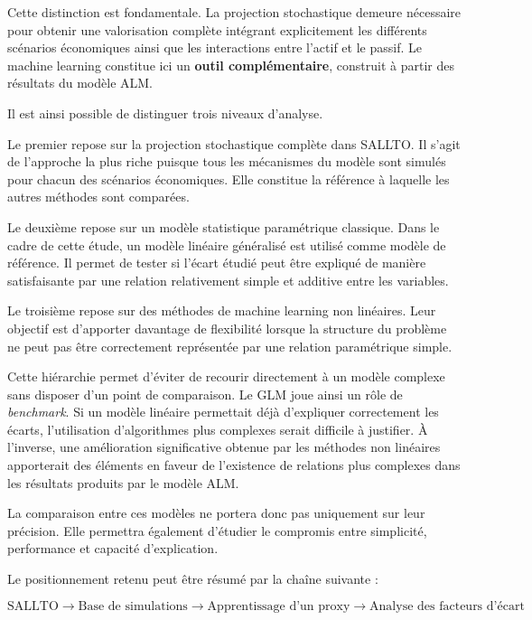 Cette distinction est fondamentale. La projection stochastique demeure nécessaire pour obtenir une valorisation complète intégrant explicitement les différents scénarios économiques ainsi que les interactions entre l'actif et le passif. Le machine learning constitue ici un \textbf{outil complémentaire}, construit à partir des résultats du modèle ALM.

Il est ainsi possible de distinguer trois niveaux d'analyse.

Le premier repose sur la projection stochastique complète dans SALLTO. Il s'agit de l'approche la plus riche puisque tous les mécanismes du modèle sont simulés pour chacun des scénarios économiques. Elle constitue la référence à laquelle les autres méthodes sont comparées.

Le deuxième repose sur un modèle statistique paramétrique classique. Dans le cadre de cette étude, un modèle linéaire généralisé est utilisé comme modèle de référence. Il permet de tester si l'écart étudié peut être expliqué de manière satisfaisante par une relation relativement simple et additive entre les variables.

Le troisième repose sur des méthodes de machine learning non linéaires. Leur objectif est d'apporter davantage de flexibilité lorsque la structure du problème ne peut pas être correctement représentée par une relation paramétrique simple.

Cette hiérarchie permet d'éviter de recourir directement à un modèle complexe sans disposer d'un point de comparaison. Le GLM joue ainsi un rôle de \textit{benchmark}. Si un modèle linéaire permettait déjà d'expliquer correctement les écarts, l'utilisation d'algorithmes plus complexes serait difficile à justifier. À l'inverse, une amélioration significative obtenue par les méthodes non linéaires apporterait des éléments en faveur de l'existence de relations plus complexes dans les résultats produits par le modèle ALM.

La comparaison entre ces modèles ne portera donc pas uniquement sur leur précision. Elle permettra également d'étudier le compromis entre simplicité, performance et capacité d'explication.

Le positionnement retenu peut être résumé par la chaîne suivante :

\begin{equation}
\boxed{
\text{SALLTO}
\longrightarrow
\text{Base de simulations}
\longrightarrow
\text{Apprentissage d'un proxy}
\longrightarrow
\text{Analyse des facteurs d'écart}
}
\end{equation}


